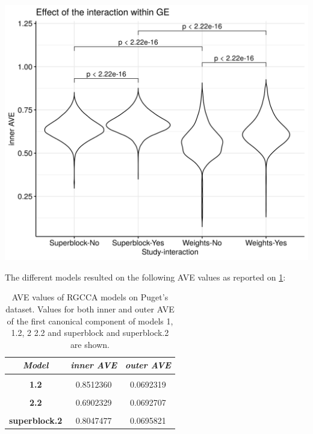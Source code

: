 \documentclass[
  12pt,
  a4paper,
  twoside,
  openright]{book}
\let\origfigure\figure
\let\endorigfigure\endfigure
\renewenvironment{figure}[1][2] {
    \expandafter\origfigure\expandafter[!htp]
} {
    \endorigfigure
}
\begin{document}
\begin{figure}
\includegraphics[width=1\linewidth]{images/pugets-weights} \caption[Effect of superblock and weights on the inner AVE on Puget's dataset.]{Effect of superblock and weights on the inner AVE on Puget's dataset. Designs with the superblock showed higher inner AVe scores than without it. Interaction yes/no indicates RNA and RNA interaction.}\label{fig:puget-weights}
\end{figure}

The different models resulted on the following AVE values as reported on \ref{tab:puget-models-ave}:

\begin{table}[H]

\caption[AVE values of RGCCA models on Puget's dataset.]{\label{tab:puget-models-ave}AVE values of RGCCA models on Puget's dataset. Values for both inner and outer AVE of the first canonical component of models 1, 1.2, 2 2.2 and superblock and superblock.2 are shown.}
\centering
\begin{tabular}[t]{|>{}c|c|>{}c|}
\hline
\em{\textbf{Model}} & \em{\textbf{inner AVE}} & \em{\textbf{outer AVE}}\\
\hline
\textbf{\cellcolor{gray!6}{1}} & \cellcolor{gray!6}{0.6333592} & \cellcolor{gray!6}{0.0692097}\\
\hline
\textbf{1.2} & 0.8512360 & 0.0692319\\
\hline
\textbf{\cellcolor{gray!6}{2}} & \cellcolor{gray!6}{0.2791546} & \cellcolor{gray!6}{0.0738695}\\
\hline
\textbf{2.2} & 0.6902329 & 0.0692707\\
\hline
\textbf{\cellcolor{gray!6}{superblock}} & \cellcolor{gray!6}{0.7055847} & \cellcolor{gray!6}{0.0734578}\\
\hline
\textbf{superblock.2} & 0.8047477 & 0.0695821\\
\hline
\end{tabular}
\end{table}
\end{document}

